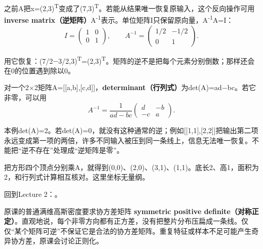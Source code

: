 之前A把x=(2,3)\textsuperscript{T}变成了(7,3)\textsuperscript{T}。若能从结果唯一恢复原输入，这个反向操作可用 \textbf{inverse matrix（逆矩阵）}A\textsuperscript{-}\textsuperscript{1}表示。单位矩阵I只保留原向量，A\textsuperscript{-}\textsuperscript{1}A=I：
\[
I=\begin{pmatrix}1&0\\0&1\end{pmatrix},\qquad
A^{-1}=\begin{pmatrix}1/2&-1/2\\0&1\end{pmatrix}.\tag{M.31}
\]


用它恢复：(7/2\ensuremath{-}3/2,3)\textsuperscript{T}=(2,3)\textsuperscript{T}。矩阵的逆不是把每个元素分别倒数；那样还会在0的位置遇到除以0。


对一个2\ensuremath{\times}2矩阵A=[[a,b],[c,d]]，\textbf{determinant（行列式）}为det(A)=ad\ensuremath{-}bc。若它非零，可以用
\[
A^{-1}=\frac1{ad-bc}\begin{pmatrix}d&-b\\-c&a\end{pmatrix}.\tag{M.32}
\]


本例det(A)=2。若det(A)=0，就没有这种通常的逆；例如[[1,1],[2,2]]把输出第二项永远变成第一项的两倍，许多不同输入被压到同一条线上，信息无法唯一恢复。不能把“逆不存在”处理成“逆矩阵是零”。






把方形四个顶点分别乘A，就得到(0,0)、(2,0)、(3,1)、(1,1)。底长2、高1，面积为2，和行列式计算相互核对。这里坐标无量纲。


回到Lecture 2：。








原课的普通满维高斯密度要求协方差矩阵 \textbf{symmetric positive definite（对称正定）}。直观地说，每个非零方向都有正方差，没有把整片分布压扁成一条线。仅仅“某个矩阵可逆”不保证它是合法的协方差矩阵。重复特征或样本不足可能产生奇异协方差，原课会讨论正则化。


